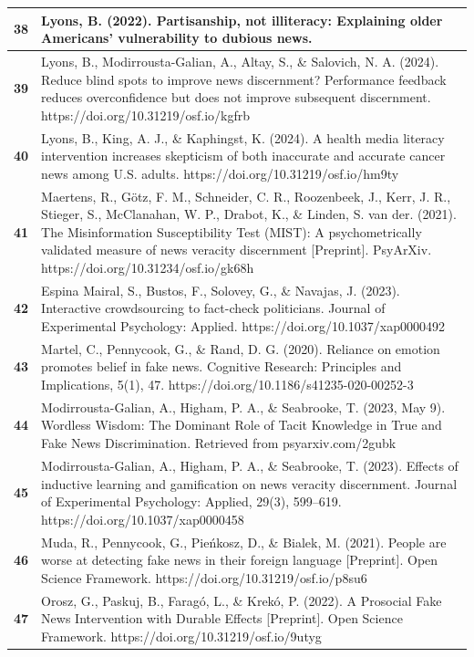 \documentclass[
  doc,floatsintext]{apa6}
\begin{document}
\begin{longtable}[t]{>{}r||>{\raggedright\arraybackslash}p{30em}}
\hline
\textbf{38} & Lyons, B. (2022). Partisanship, not illiteracy: Explaining older Americans’ vulnerability to dubious news.\\
\hline
\textbf{39} & Lyons, B., Modirrousta-Galian, A., Altay, S., \& Salovich, N. A. (2024). Reduce blind spots to improve news discernment? Performance feedback reduces overconfidence but does not improve subsequent discernment. https://doi.org/10.31219/osf.io/kgfrb\\
\hline
\textbf{40} & Lyons, B., King, A. J., \& Kaphingst, K. (2024). A health media literacy intervention increases skepticism of both inaccurate and accurate cancer news among U.S. adults. https://doi.org/10.31219/osf.io/hm9ty\\
\hline
\textbf{41} & Maertens, R., Götz, F. M., Schneider, C. R., Roozenbeek, J., Kerr, J. R., Stieger, S., McClanahan, W. P., Drabot, K., \& Linden, S. van der. (2021). The Misinformation Susceptibility Test (MIST): A psychometrically validated measure of news veracity discernment [Preprint]. PsyArXiv. https://doi.org/10.31234/osf.io/gk68h\\
\hline
\textbf{42} & Espina Mairal, S., Bustos, F., Solovey, G., \& Navajas, J. (2023). Interactive crowdsourcing to fact-check politicians. Journal of Experimental Psychology: Applied. https://doi.org/10.1037/xap0000492\\
\hline
\textbf{43} & Martel, C., Pennycook, G., \& Rand, D. G. (2020). Reliance on emotion promotes belief in fake news. Cognitive Research: Principles and Implications, 5(1), 47. https://doi.org/10.1186/s41235-020-00252-3\\
\hline
\textbf{44} & Modirrousta-Galian, A., Higham, P. A., \& Seabrooke, T. (2023, May 9). Wordless Wisdom: The Dominant Role of Tacit Knowledge in True and Fake News Discrimination. Retrieved from psyarxiv.com/2gubk\\
\hline
\textbf{45} & Modirrousta-Galian, A., Higham, P. A., \& Seabrooke, T. (2023). Effects of inductive learning and gamification on news veracity discernment. Journal of Experimental Psychology: Applied, 29(3), 599–619. https://doi.org/10.1037/xap0000458\\
\hline
\textbf{46} & Muda, R., Pennycook, G., Pieńkosz, D., \& Bialek, M. (2021). People are worse at detecting fake news in their foreign language [Preprint]. Open Science Framework. https://doi.org/10.31219/osf.io/p8su6\\
\hline
\textbf{47} & Orosz, G., Paskuj, B., Faragó, L., \& Krekó, P. (2022). A Prosocial Fake News Intervention with Durable Effects [Preprint]. Open Science Framework. https://doi.org/10.31219/osf.io/9utyg\\

\end{longtable}
\end{document}
